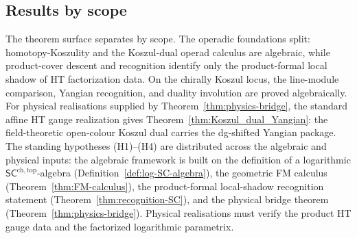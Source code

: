 \documentclass[11pt]{memoir}
\newcommand{\SCchtop}{{\mathsf{SC}^{\mathrm{ch,top}}}}
\begin{document}
\subsection*{Results by scope}
\label{subsec:scope-stratification}

The theorem surface separates by scope. The operadic
foundations split: homotopy-Koszulity and the Koszul-dual operad
calculus are algebraic, while product-cover descent and recognition
identify only the product-formal local shadow of HT factorization
data. On the chirally Koszul locus, the
line-module comparison, Yangian recognition, and duality
involution are proved algebraically. For physical
realisations supplied by Theorem~\ref{thm:physics-bridge}, the
standard affine HT gauge realization gives
Theorem~\ref{thm:Koszul_dual_Yangian}: the field-theoretic
open-colour Koszul dual carries the dg-shifted Yangian
package.
The standing hypotheses (H1)--(H4) are distributed across the
algebraic and physical inputs: the algebraic framework is
built on the definition of a logarithmic $\SCchtop$-algebra
(Definition~\ref{def:log-SC-algebra}), the geometric FM calculus
(Theorem~\ref{thm:FM-calculus}), the product-formal local-shadow
recognition statement (Theorem~\ref{thm:recognition-SC}), and the
physical bridge theorem (Theorem~\ref{thm:physics-bridge}). Physical
realisations must verify the product HT gauge data and the factorized
logarithmic parametrix.
\end{document}
